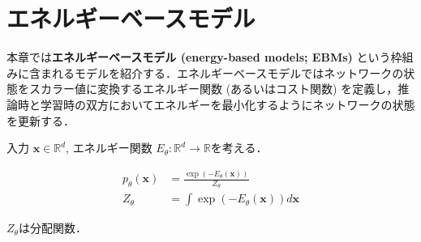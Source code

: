 \section{エネルギーベースモデル}
本章では\textbf{エネルギーベースモデル (energy-based models; EBMs)} という枠組みに含まれるモデルを紹介する．エネルギーベースモデルではネットワークの状態をスカラー値に変換するエネルギー関数 (あるいはコスト関数) を定義し，推論時と学習時の双方においてエネルギーを最小化するようにネットワークの状態を更新する．\citep{LeCun2006-dt}

入力 $\mathbf{x}\in \mathbb{R}^d$, エネルギー関数 $E_\theta: \mathbb{R}^d\to \mathbb{R}$を考える．


\begin{align}
p_\theta(\mathbf{x})&=\frac{\exp(-E_\theta(\mathbf{x}))}{Z_\theta}\\
Z_\theta &= \int \exp(-E_\theta(\mathbf{x})) d\mathbf{x}
\end{align}


$Z_\theta$は分配関数．
